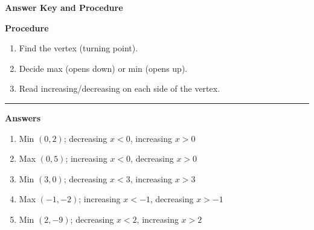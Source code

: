 \documentclass[12pt]{article}
\begin{document}
\begin{center}{\Large \textbf{Answer Key and Procedure}}\end{center}
\vspace{0.3cm}
\textbf{Procedure}
\begin{enumerate}
  \item Find the vertex (turning point).
  \item Decide max (opens down) or min (opens up).
  \item Read increasing/decreasing on each side of the vertex.
\end{enumerate}
\vspace{0.4cm}\hrule\vspace{0.4cm}
\textbf{Answers}
\begin{enumerate}[label=\textbf{\arabic*.}]
  \item Min $(0,2)$; decreasing $x<0$, increasing $x>0$
  \item Max $(0,5)$; increasing $x<0$, decreasing $x>0$
  \item Min $(3,0)$; decreasing $x<3$, increasing $x>3$
  \item Max $(-1,-2)$; increasing $x<-1$, decreasing $x>-1$
  \item Min $(2,-9)$; decreasing $x<2$, increasing $x>2$
\end{enumerate}
\end{document}

